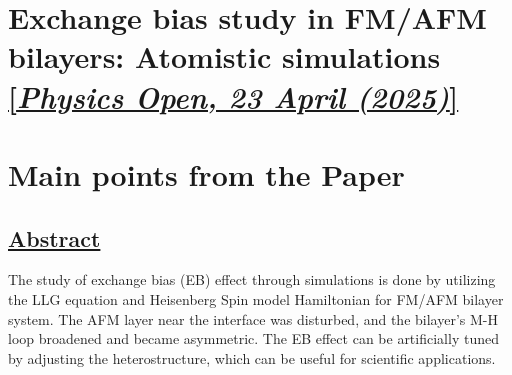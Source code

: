 \newpage
\section{Exchange bias study in FM/AFM bilayers: Atomistic simulations \href{https://doi.org/10.1016/j.physo.2025.100265}{[\textit{Physics Open, 23 April (2025)}]}}


\section*{Main points from the Paper}
\subsection*{\centering\underline{Abstract}}
\hspace{2cm} The study of exchange bias (EB) effect through simulations is done by utilizing the LLG equation and Heisenberg Spin model Hamiltonian for FM/AFM bilayer system. The AFM layer near the interface was disturbed, and the bilayer's M-H loop broadened and became asymmetric.
The EB effect can be artificially tuned by adjusting the heterostructure, which can be useful for scientific applications.


